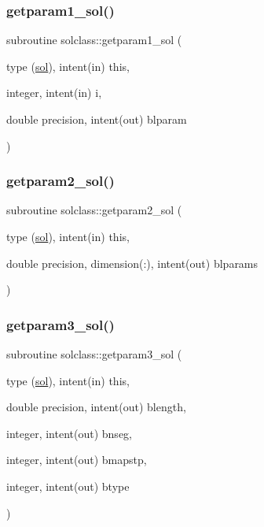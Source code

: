 \subsubsection{\texorpdfstring{getparam1\_sol()}{getparam1\_sol()}}
{\footnotesize\ttfamily subroutine solclass\+::getparam1\+\_\+sol (\begin{DoxyParamCaption}\item[{type (\mbox{\hyperlink{namespacesolclass_structsolclass_1_1sol}{sol}}), intent(in)}]{this,  }\item[{integer, intent(in)}]{i,  }\item[{double precision, intent(out)}]{blparam }\end{DoxyParamCaption})}

\mbox{\label{namespacesolclass_aab6c073c4b20670742987b17bcb8366d}} 
\subsubsection{\texorpdfstring{getparam2\_sol()}{getparam2\_sol()}}
{\footnotesize\ttfamily subroutine solclass\+::getparam2\+\_\+sol (\begin{DoxyParamCaption}\item[{type (\mbox{\hyperlink{namespacesolclass_structsolclass_1_1sol}{sol}}), intent(in)}]{this,  }\item[{double precision, dimension(\+:), intent(out)}]{blparams }\end{DoxyParamCaption})}

\mbox{\label{namespacesolclass_a11962a787b8bed31dd906ac4a5e2853e}} 
\subsubsection{\texorpdfstring{getparam3\_sol()}{getparam3\_sol()}}
{\footnotesize\ttfamily subroutine solclass\+::getparam3\+\_\+sol (\begin{DoxyParamCaption}\item[{type (\mbox{\hyperlink{namespacesolclass_structsolclass_1_1sol}{sol}}), intent(in)}]{this,  }\item[{double precision, intent(out)}]{blength,  }\item[{integer, intent(out)}]{bnseg,  }\item[{integer, intent(out)}]{bmapstp,  }\item[{integer, intent(out)}]{btype }\end{DoxyParamCaption})}

